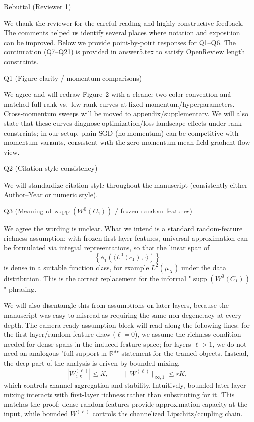 Rebuttal (Reviewer 1)

We thank the reviewer for the careful reading and highly constructive feedback. The comments helped us identify several places where notation and exposition can be improved. Below we provide point-by-point responses for Q1--Q6. The continuation (Q7--Q21) is provided in answer5.tex to satisfy OpenReview length constraints.

Q1 (Figure clarity / momentum comparisons)

We agree and will redraw Figure~2 with a cleaner two-color convention and matched full-rank vs.\ low-rank curves at fixed momentum/hyperparameters. Cross-momentum sweeps will be moved to appendix/supplementary. We will also state that these curves diagnose optimization/loss-landscape effects under rank constraints; in our setup, plain SGD (no momentum) can be competitive with momentum variants, consistent with the zero-momentum mean-field gradient-flow view.

Q2 (Citation style consistency)

We will standardize citation style throughout the manuscript (consistently either Author--Year or numeric style).

Q3 (Meaning of $\operatorname{supp}(W^0(C_1))$ / frozen random features)

We agree the wording is unclear. What we intend is a standard random-feature richness assumption: with frozen first-layer features, universal approximation can be formulated via integral representations, so that the linear span of
$$
\left\{\phi_1(\langle L^0(c_1),\cdot\rangle)\right\}
$$
is dense in a suitable function class, for example $L^2(\mu_X)$ under the data distribution. This is the correct replacement for the informal "$\operatorname{supp}(W^0(C_1))$" phrasing.

We will also disentangle this from assumptions on later layers, because the manuscript was easy to misread as requiring the same non-degeneracy at every depth. The camera-ready assumption block will read along the following lines: for the first layer/random feature draw ($\ell=0$), we assume the richness condition needed for dense spans in the induced feature space; for layers $\ell>1$, we do not need an analogous "full support in $\mathbb{R}^d$" statement for the trained objects. Instead, the deep part of the analysis is driven by bounded mixing,
$$
|W^{(\ell)}_{c,k}|\le K,
\qquad
\|W^{(\ell)}\|_{\infty,1}\le rK,
$$
which controls channel aggregation and stability. Intuitively, bounded later-layer mixing interacts with first-layer richness rather than substituting for it. This matches the proof: dense random features provide approximation capacity at the input, while bounded $W^{(\ell)}$ controls the channelized Lipschitz/coupling chain.

